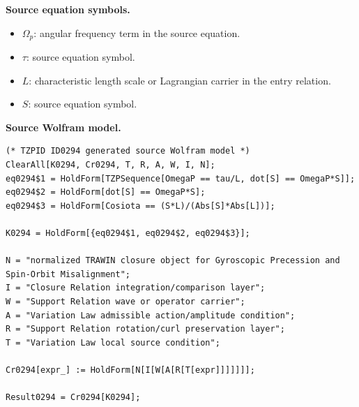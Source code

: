 \begin{minipage}[t]{0.49\linewidth}
\begingroup
\small
\raggedright
\textbf{Source equation symbols.}\par
\begin{itemize}[leftmargin=1.35em,itemsep=1pt,topsep=1pt,parsep=0pt]
    \item $\Omega_p$: angular frequency term in the source equation.
    \item $\tau$: source equation symbol.
    \item $L$: characteristic length scale or Lagrangian carrier in the entry relation.
    \item $S$: source equation symbol.
\end{itemize}
\endgroup
\end{minipage}\hfill
\begin{minipage}[t]{0.47\linewidth}
\begingroup
\scriptsize
\raggedright
\textbf{Source Wolfram model.}\par
\begin{Verbatim}[fontsize=\tiny,breaklines=true,breakanywhere=true]
(* TZPID ID0294 generated source Wolfram model *)
ClearAll[K0294, Cr0294, T, R, A, W, I, N];
eq0294$1 = HoldForm[TZPSequence[OmegaP == tau/L, dot[S] == OmegaP*S]];
eq0294$2 = HoldForm[dot[S] == OmegaP*S];
eq0294$3 = HoldForm[Cosiota == (S*L)/(Abs[S]*Abs[L])];

K0294 = HoldForm[{eq0294$1, eq0294$2, eq0294$3}];

N = "normalized TRAWIN closure object for Gyroscopic Precession and Spin-Orbit Misalignment";
I = "Closure Relation integration/comparison layer";
W = "Support Relation wave or operator carrier";
A = "Variation Law admissible action/amplitude condition";
R = "Support Relation rotation/curl preservation layer";
T = "Variation Law local source condition";

Cr0294[expr_] := HoldForm[N[I[W[A[R[T[expr]]]]]]];

Result0294 = Cr0294[K0294];
\end{Verbatim}
\endgroup
\end{minipage}

